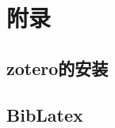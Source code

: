 \chapter{附\texorpdfstring{\quad}{}录}
\renewcommand{\thesection}{{附录}\arabic{section}}
\setcounter{section}{0}
\section{zotero的安装}

\section{BibLatex}

